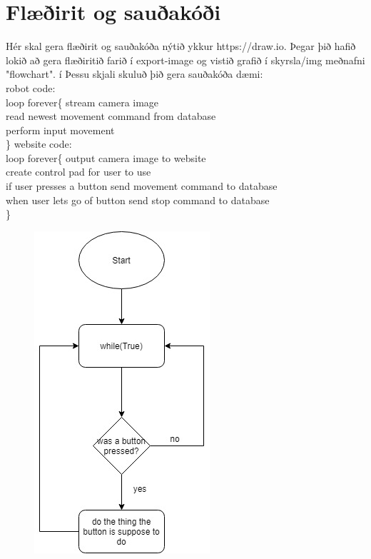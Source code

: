 \section{Flæðirit og sauðakóði}Hér skal gera flæðirit og sauðakóða nýtið ykkur https://draw.io. Þegar þið hafið lokið að gera flæðiritið farið í export-image og vistið grafið í skyrsla/img meðnafni "flowchart". í Þessu skjali skuluð þið gera sauðakóða 
dæmi:\\
robot code:\\
loop forever\{
   stream camera image\\
   read newest movement command from database\\
   perform input movement\\
\}
website code:\\
loop forever\{
   output camera image to website\\
   create control pad for user to use\\
   if user presses a button send movement command to database\\
   when user lets go of button send stop command to database\\
\}

\begin{figure}[h]
\includegraphics[scale=.3]{img/Diagram}
\end{figure}
